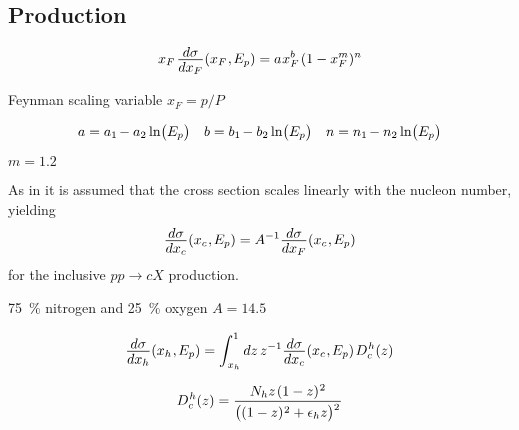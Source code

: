 \subsection*{Production}

\begin{equation*}
	x_F \kern+1.0pt \frac{\raisebox{-0.5ex}{$d\sigma$}}{\raisebox{0.5ex}{$dx_F$}} (x_F \kern+0.5pt, \kern-0.5pt E_p)
	= a \kern+0.5pt x_F^b \kern+1.0pt (1 - x_F^m)^n
\end{equation*}

Feynman scaling variable $x_F = p / P$

\cite{Goncalves_2007}

\begin{align*}
	a = a_1 \kern-1.0pt - a_2 \ln\bigl(E_p\bigr) && b = b_1 \kern-1.0pt - b_2 \ln\bigl(E_p\bigr) &&
	n = n_1 \kern-1.0pt - n_2 \ln\bigl(E_p\bigr)
\end{align*}

$m = \num{1.2}$ 



As in \cite{Bhattacharya_2015} it is assumed that the cross section scales linearly with the nucleon number, yielding
\begin{equation*}
	\frac{\raisebox{-0.5ex}{$d\sigma$}}{\raisebox{0.5ex}{$dx_c$}} (x_c \kern+0.5pt, \kern-0.5pt E_p) = A^{-1}
	\frac{\raisebox{-0.5ex}{$d\sigma$}}{\raisebox{0.5ex}{$dx_F$}} (x_c \kern+0.5pt, \kern-0.5pt E_p)
\end{equation*}
for the inclusive $pp \rightarrow cX$ production.

\qty{75}{\percent} nitrogen and \qty{25}{\percent} oxygen $A = \num{14.5}$

\begin{equation*}
	\frac{\raisebox{-0.5ex}{$d\sigma$}}{\raisebox{0.5ex}{$dx_h$}} (x_h \kern+0.5pt, \kern-0.5pt E_p) = \int_{\kern+0.5pt x_h}^1 dz \, z^{-1}
	\frac{\raisebox{-0.5ex}{$d\sigma$}}{\raisebox{0.5ex}{$dx_c$}} (x_c \kern+0.5pt, \kern-0.5pt E_p) \kern+1.0pt D^{\kern+0.5pt h}_c (z)
\end{equation*}



\begin{equation}
	D^{\kern+0.5pt h}_{c}(z) = \frac{N_h z \kern+1.0pt (1 - z)^{\kern+0.5pt 2}}
	{\bigl((1 - z)^{\kern+0.5pt 2} + \epsilon_h z \bigl)^{\raisebox{-1.5ex}{$^2$}}}
	\label{eqn:fragmentation}
\end{equation}



